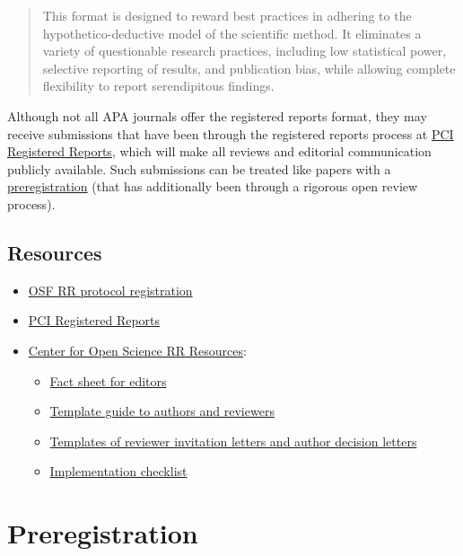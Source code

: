 \documentclass[
  oneside]{book}
\providecommand{\tightlist}{%
  \setlength{\itemsep}{0pt}\setlength{\parskip}{0pt}}
\begin{document}
\begin{quote}
This format is designed to reward best practices in adhering to the hypothetico-deductive model of the scientific method. It eliminates a variety of questionable research practices, including low statistical power, selective reporting of results, and publication bias, while allowing complete flexibility to report serendipitous findings.
\end{quote}

Although not all APA journals offer the registered reports format, they may receive submissions that have been through the registered reports process at \href{https://rr.peercommunityin.org/}{PCI Registered Reports}, which will make all reviews and editorial communication publicly available. Such submissions can be treated like papers with a \protect\hyperlink{preregistration}{preregistration} (that has additionally been through a rigorous open review process).

\hypertarget{resources-1}{%
\section{Resources}\label{resources-1}}

\begin{itemize}
\tightlist
\item
  \href{https://osf.io/rr/}{OSF RR protocol registration}
\item
  \href{https://rr.peercommunityin.org/}{PCI Registered Reports}
\item
  \href{https://www.cos.io/initiatives/registered-reports}{Center for Open Science RR Resources}:

  \begin{itemize}
  \tightlist
  \item
    \href{https://osf.io/jbeus/}{Fact sheet for editors}
  \item
    \href{https://osf.io/pukzy/}{Template guide to authors and reviewers}
  \item
    \href{https://osf.io/5adi7/}{Templates of reviewer invitation letters and author decision letters}
  \item
    \href{https://osf.io/2m4ct/}{Implementation checklist}
  \end{itemize}
\end{itemize}

\hypertarget{preregistration}{%
\chapter{Preregistration}\label{preregistration}}
\end{document}
